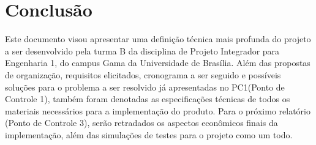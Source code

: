 \chapter{Conclusão}
  Este documento visou apresentar uma definição técnica mais profunda do projeto a ser desenvolvido pela turma B da disciplina de Projeto Integrador para Engenharia 1, do campus Gama da Universidade de Brasília. Além das propostas de organização, requisitos elicitados, cronograma a ser seguido e possíveis soluções para o problema a ser resolvido já apresentadas no PC1(Ponto de Controle 1), também foram denotadas as especificações técnicas de todos os materiais necessários para a implementação do produto. Para o próximo relatório (Ponto de Controle 3), serão retradados os aspectos econômicos finais da implementação, além das simulações de testes para o projeto como um todo.  
